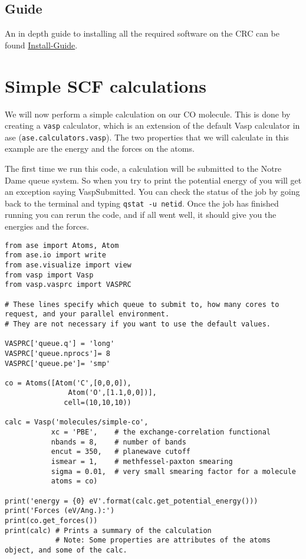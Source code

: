 \documentclass[11pt]{article}
\begin{document}
\subsection{Guide}
\label{sec:orga25ccc2}
An in depth guide to installing all the required software on the CRC can be found \href{./ASE.org}{Install-Guide}.
\section{Simple SCF calculations}
\label{sec:org602087f}

We will now perform a simple calculation on our CO molecule. This is done by creating a \texttt{vasp} calculator, which is an extension of the default Vasp calculator in ase (\texttt{ase.calculators.vasp}). The two properties that we will calculate in this example are the energy and the forces on the atoms. 

The first time we run this code, a calculation will be submitted to the Notre Dame queue system. So when you try to print the potential energy of you will get an exception saying VaspSubmitted. You can check the status of the job by going back to the terminal and typing \texttt{qstat -u netid}. Once the job has finished running you can rerun the code, and if all went well, it should give you the energies and the forces.

\begin{verbatim}
from ase import Atoms, Atom
from ase.io import write
from ase.visualize import view
from vasp import Vasp
from vasp.vasprc import VASPRC

# These lines specify which queue to submit to, how many cores to request, and your parallel environment.
# They are not necessary if you want to use the default values.

VASPRC['queue.q'] = 'long'
VASPRC['queue.nprocs']= 8
VASPRC['queue.pe']= 'smp'

co = Atoms([Atom('C',[0,0,0]),
               Atom('O',[1.1,0,0])],
              cell=(10,10,10))

calc = Vasp('molecules/simple-co',
           xc = 'PBE',    # the exchange-correlation functional
           nbands = 8,    # number of bands
           encut = 350,   # planewave cutoff
           ismear = 1,    # methfessel-paxton smearing
           sigma = 0.01,  # very small smearing factor for a molecule
           atoms = co)

print('energy = {0} eV'.format(calc.get_potential_energy()))
print('Forces (eV/Ang.):')
print(co.get_forces())
print(calc) # Prints a summary of the calculation
            # Note: Some properties are attributes of the atoms object, and some of the calc. 
\end{verbatim}
\end{document}
